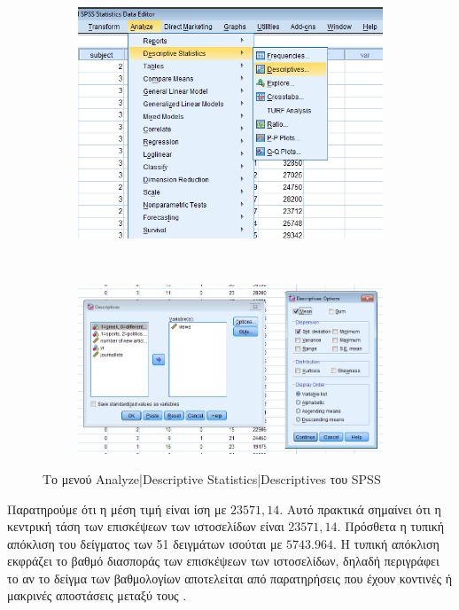 \documentclass{assignment}
\begin{document}
\begin{Assignment}[Μέρος Α]
\begin{figure}[htbp]
  \centering
  \begin{subfigure}[b]{0.5\textwidth}
     \includegraphics[width=\textwidth,height=0.25\textheight]{images/menu_mean.png}
  \end{subfigure}%
   ~ %
  \begin{subfigure}[b]{0.5\textwidth}
    \includegraphics[width=\textwidth,height=0.25\textheight]{images/mean.png}
  \end{subfigure}
  \caption{Το μενού Analyze|Descriptive Statistics|Descriptives του SPSS}
\label{fig:mean}
\end{figure}

Παρατηρούμε ότι η μέση τιμή είναι ίση με $23571,14$. Αυτό πρακτικά σημαίνει ότι η κεντρική τάση των επισκέψεων των ιστοσελίδων είναι $23571,14$. Πρόσθετα η τυπική απόκλιση του δείγματος των 51 δειγμάτων ισούται με $5743.964$. Η τυπική απόκλιση εκφράζει το βαθμό διασποράς των επισκέψεων των ιστοσελίδων, δηλαδή περιγράφει το αν το δείγμα των βαθμολογίων αποτελείται από παρατηρήσεις που έχουν κοντινές ή μακρινές αποστάσεις μεταξύ τους \cite{class_notes}.


\end{Assignment}
\end{document}
